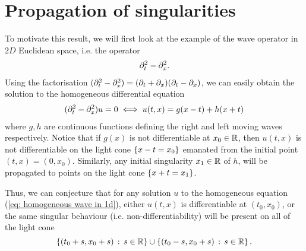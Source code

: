 \documentclass[12pt]{article}
\begin{document}




\section{Propagation of singularities} 

To motivate this result, we will first look at the example of the wave operator in $2D$ Euclidean space, i.e. the operator
\begin{align*}
\partial_t^2 - \partial_x^2. 
\end{align*}
Using the factorisation $(\partial_t^2 - \partial_x^2) = (\partial_t + \partial_x) (\partial_t - \partial_x)$, we can easily obtain the solution to the homogeneous differential equation 
\begin{align}
(\partial_t^2 - \partial_x^2) u = 0 \iff u(t, x) = g(x -t) + h(x + t) \label{eq: homogeneous wave in 1d} 
\end{align}
where $g, h$ are continuous functions defining the right and left moving waves respectively. Notice that if $g(x)$ is not differentiable at $x_0 \in {\ensuremath {\mathbb R}}$, then $u(t, x)$ is not differentiable on the light cone $\left\{x - t = x_0\right\}$ emanated from the initial point $(t, x) = (0, x_0)$. Similarly, any initial singularity $x_1 \in {\ensuremath {\mathbb R}}$ of $h$, will be propagated to points on the light cone $\left\{x + t = x_1\right\}$. 

\begin{center}
\end{center}

Thus, we can conjecture that for any solution $u$ to the homogeneous equation (\ref{eq: homogeneous wave in 1d}), either $u(t, x)$ is differentiable at $(t_0, x_0)$, or the same singular behaviour (i.e. non-differentiability) will be present on all of the light cone 
$$\left\{(t_0 + s, x_0 +s) \, : \, s \in {\ensuremath {\mathbb R}}\right\} \cup \left\{(t_0 - s, x_0 + s) \, : \, s \in {\ensuremath {\mathbb R}}\right\}.$$
\end{document}
